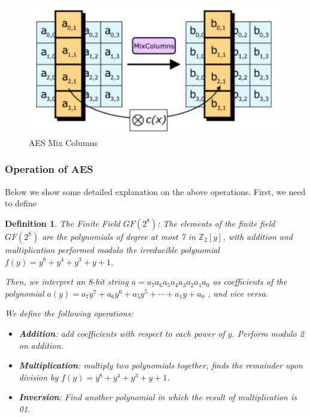 \documentclass[12pt,titlepage]{article}
\newtheorem{protodefinition}[prototheorem]{Definition}
\newenvironment{definition}
{\colorlet{shadecolor}{cyan!15}\begin{shaded}\begin{protodefinition}\normalfont}{\end{protodefinition}\end{shaded}}
\begin{document}
\begin{itemize}
\begin{enumerate}
\begin{center}
\begin{figure}[h!]
		\includegraphics[width=\textwidth]{AES_Mix_Columns.png}
		\caption{AES Mix Columns}
	\end{figure}
\end{center}
\end{enumerate}
\end{itemize}
\subsubsection{Operation of AES}
Below we show some detailed explanation on the above operations. First, we need to define 
\begin{definition}
	The Finite Field $GF(2^8)$: The elements of the finite field $GF(2^8)$ are the polynomials of degree at most 7 in $\mathbb{Z}_2[y]$, with addition and multiplication performed modulo the irreducible polynomial $f(y) = y^8 + y^4 + y^3 + y + 1$.
	
	Then, we interpret an 8-bit string $a = a_7 a_6 a_5 a_4 a_3 a_2 a_1 a_0$ as coefficients of the polynomial $a(y) = a_7 y^7 + a_6 y^6 + a_5 y^5 + \cdots + a_1 y + a_0$ , and vice versa.
	
	We define the following operations: \begin{itemize}
	\item \textbf{Addition}: add coefficients with respect to each power of $y$. Perform modulo 2 on addition. 
	\item \textbf{Multiplication}: multiply two polynomials together, finds the remainder upon division by $f(y) = y^8 + y^4 + y^3 + y + 1$. 
	\item \textbf{Inversion}: Find another polynomial in which the result of multiplication is 01. 
	\end{itemize}
\end{definition}
\end{document}
